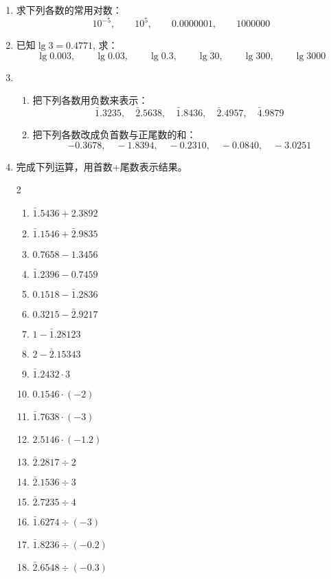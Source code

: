 \begin{ex}
\begin{enumerate}
    \item 求下列各数的常用对数：
\[10^{-5},\qquad 10^5,\qquad 0.0000001,\qquad 1000000\]

\item 已知$\lg 3=0.4771$, 求：
\[\lg0.003,\qquad \lg0.03,\qquad \lg0.3,\qquad \lg30,\qquad \lg300,\qquad \lg3000\]

\item \begin{enumerate}
    \item 把下列各数用负数来表示：
    \[\bar{1}.3235,\quad \bar{2}.5638,\quad \bar{1}.8436,\quad \bar{2}.4957,\quad \bar{4}.9879\]
    \item 把下列各数改成负首数与正尾数的和：
    \[-0.3678,\quad-1.8394,\quad-0.2310,\quad-0.0840,\quad-3.0251\]
\end{enumerate}

\item  完成下列运算，用首数$+$尾数表示结果。
\begin{multicols}{2}
\begin{enumerate}
    \item $\bar{1}.5436+2.3892$
    \item $\bar{1}.1546+\bar{2}.9835$
    \item $0.7658-1.3456$
    \item $\bar{1}.2396-0.7459$
    \item $0.1518-\bar{1}.2836$
    \item $0.3215-\bar{2}.9217$
    \item $1-\bar{1}.28123$
    \item $2-\bar{2}.15343$
    \item $\bar{1}.2432\cdot 3$
    \item $0.1546\cdot (-2)$
    \item $\bar{1}.7638\cdot (-3)$
    \item $2.5146\cdot (-1.2)$
    \item $\bar{2}.2817\div 2$
    \item $\bar{2}.1536\div 3$
    \item $\bar{2}.7235\div 4$
    \item $\bar{1}.6274\div (-3)$
    \item $\bar{1}.8236\div (-0.2)$
    \item $\bar{2}.6548\div (-0.3)$  
\end{enumerate}
\end{multicols}


\end{enumerate}
\end{ex}
